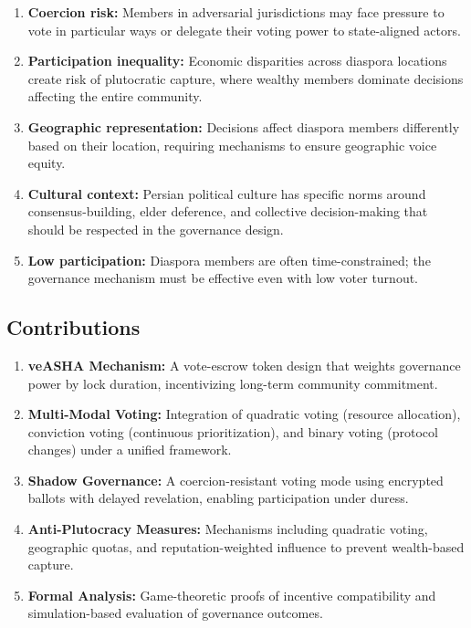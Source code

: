 \documentclass[11pt,a4paper]{article}
\begin{document}
\begin{enumerate}[label=(\arabic*)]
    \item \textbf{Coercion risk:} Members in adversarial jurisdictions may face pressure to vote in particular ways or delegate their voting power to state-aligned actors.
    \item \textbf{Participation inequality:} Economic disparities across diaspora locations create risk of plutocratic capture, where wealthy members dominate decisions affecting the entire community.
    \item \textbf{Geographic representation:} Decisions affect diaspora members differently based on their location, requiring mechanisms to ensure geographic voice equity.
    \item \textbf{Cultural context:} Persian political culture has specific norms around consensus-building, elder deference, and collective decision-making that should be respected in the governance design.
    \item \textbf{Low participation:} Diaspora members are often time-constrained; the governance mechanism must be effective even with low voter turnout.
\end{enumerate}

\subsection{Contributions}

\begin{enumerate}[label=(\roman*)]
    \item \textbf{veASHA Mechanism:} A vote-escrow token design that weights governance power by lock duration, incentivizing long-term community commitment.
    \item \textbf{Multi-Modal Voting:} Integration of quadratic voting (resource allocation), conviction voting (continuous prioritization), and binary voting (protocol changes) under a unified framework.
    \item \textbf{Shadow Governance:} A coercion-resistant voting mode using encrypted ballots with delayed revelation, enabling participation under duress.
    \item \textbf{Anti-Plutocracy Measures:} Mechanisms including quadratic voting, geographic quotas, and reputation-weighted influence to prevent wealth-based capture.
    \item \textbf{Formal Analysis:} Game-theoretic proofs of incentive compatibility and simulation-based evaluation of governance outcomes.
\end{enumerate}
\end{document}
